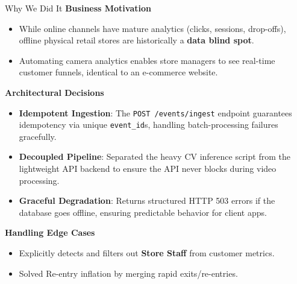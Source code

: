 \documentclass[10pt]{beamer}
\begin{document}
\begin{frame}{Why We Did It}
\textbf{Business Motivation}
\begin{itemize}
    \item While online channels have mature analytics (clicks, sessions, drop-offs), offline physical retail stores are historically a \textbf{data blind spot}.
    \item Automating camera analytics enables store managers to see real-time customer funnels, identical to an e-commerce website.
\end{itemize}

\vspace{0.3cm}
\textbf{Architectural Decisions}
\begin{itemize}
    \item \textbf{Idempotent Ingestion}: The \texttt{POST /events/ingest} endpoint guarantees idempotency via unique \texttt{event\_id}s, handling batch-processing failures gracefully.
    \item \textbf{Decoupled Pipeline}: Separated the heavy CV inference script from the lightweight API backend to ensure the API never blocks during video processing.
    \item \textbf{Graceful Degradation}: Returns structured HTTP 503 errors if the database goes offline, ensuring predictable behavior for client apps.
\end{itemize}

\vspace{0.3cm}
\textbf{Handling Edge Cases}
\begin{itemize}
    \item Explicitly detects and filters out \textbf{Store Staff} from customer metrics.
    \item Solved Re-entry inflation by merging rapid exits/re-entries.
\end{itemize}
\end{frame}
\end{document}
